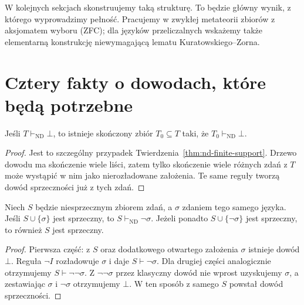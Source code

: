 W kolejnych sekcjach skonstruujemy taką strukturę. To będzie główny wynik, z którego wyprowadzimy pełność. Pracujemy w zwykłej metateorii zbiorów z aksjomatem wyboru (ZFC); dla języków przeliczalnych wskażemy także elementarną konstrukcję niewymagającą lematu Kuratowskiego--Zorna.

\section{Cztery fakty o dowodach, które będą potrzebne}
\begin{lemat}\label{lem:henkin-finite-contradiction}
Jeśli $T\vdash_{\mathrm{ND}}\bot$, to istnieje skończony zbiór $T_0\subseteq T$ taki, że $T_0\vdash_{\mathrm{ND}}\bot$.
\end{lemat}
\begin{proof}
Jest to szczególny przypadek Twierdzenia~\ref{thm:nd-finite-support}. Drzewo dowodu ma skończenie wiele liści, zatem tylko skończenie wiele różnych zdań z $T$ może wystąpić w nim jako nierozładowane założenia. Te same reguły tworzą dowód sprzeczności już z tych zdań.
\end{proof}

\begin{lemat}\label{lem:henkin-extension-neg}
Niech $S$ będzie niesprzecznym zbiorem zdań, a $\sigma$ zdaniem tego samego języka. Jeśli $S\cup\{\sigma\}$ jest sprzeczny, to $S\vdash_{\mathrm{ND}}\neg\sigma$. Jeżeli ponadto $S\cup\{\neg\sigma\}$ jest sprzeczny, to również $S$ jest sprzeczny.
\end{lemat}
\begin{proof}
Pierwsza część: z $S$ oraz dodatkowego otwartego założenia $\sigma$ istnieje dowód $\bot$. Reguła $\neg I$ rozładowuje $\sigma$ i daje $S\vdash\neg\sigma$. Dla drugiej części analogicznie otrzymujemy $S\vdash\neg\neg\sigma$. Z $\neg\neg\sigma$ przez klasyczny dowód nie wprost uzyskujemy $\sigma$, a zestawiając $\sigma$ i $\neg\sigma$ otrzymujemy $\bot$. W ten sposób z samego $S$ powstał dowód sprzeczności.
\end{proof}

